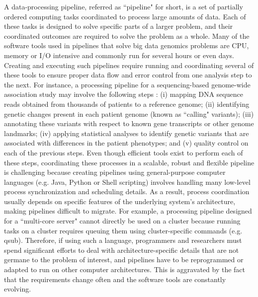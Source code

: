 A data-processing pipeline, referred as ``pipeline" for short, is a set of partially ordered computing tasks coordinated to process large amounts of data. Each of these tasks is designed to solve specific parts of a larger problem, and their coordinated outcomes are required to solve the problem as a whole. Many of the software tools used in pipelines that solve big data genomics problems are CPU, memory or I/O intensive and commonly run for several hours or even days. Creating and executing such pipelines require running and coordinating several of these tools to ensure proper data flow and error control from one analysis step to the next. For instance, a processing pipeline for a sequencing-based genome-wide association study may involve the following steps \cite{auwera2013fastq}: (i) mapping DNA sequence reads obtained from thousands of patients to a reference genome; (ii) identifying genetic changes present in each patient genome (known as ``calling" variants); (iii) annotating these variants with respect to known gene transcripts or other genome landmarks; (iv) applying statistical analyses to identify genetic variants that are associated with differences in the patient phenotypes; and (v) quality control on each of the previous steps. Even though efficient tools exist to perform each of these steps, coordinating these processes in a scalable, robust and flexible pipeline is challenging because creating pipelines using general-purpose computer languages (e.g. Java, Python or Shell scripting) involves handling many low-level process synchronization and scheduling details. As a result, process coordination usually depends on specific features of the underlying system’s architecture, making pipelines difficult to migrate. For example, a processing pipeline designed for a ``multi-core server" cannot directly be used on a cluster because running tasks on a cluster requires queuing them using cluster-specific commands (e.g. qsub). Therefore, if using such a language, programmers and researchers must spend significant efforts to deal with architecture-specific details that are not germane to the problem of interest, and pipelines have to be reprogrammed or adapted to run on other computer architectures. This is aggravated by the fact that the requirements change often and the software tools are constantly evolving.

